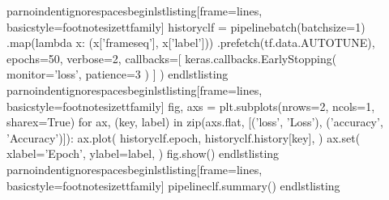 \markdownRendererDocumentBegin
\markdownRendererBackslash{}par\markdownRendererBackslash{}noindent\markdownRendererBackslash{}ignorespaces\markdownRendererBackslash{}begin\markdownRendererLeftBrace{}lstlisting\markdownRendererRightBrace{}[frame=lines, basicstyle=\markdownRendererBackslash{}footnotesize\markdownRendererBackslash{}ttfamily] historyclf = pipelinebatch(batch\markdownRendererUnderscore{}size=1) .map(lambda x: (x['frameseq'], x['label'])) .prefetch(tf.data.AUTOTUNE), epochs=50, verbose=2, callbacks=[ keras.callbacks.EarlyStopping( monitor='loss', patience=3 ) ] ) \markdownRendererBackslash{}end\markdownRendererLeftBrace{}lstlisting\markdownRendererRightBrace{} \markdownRendererBackslash{}par\markdownRendererBackslash{}noindent\markdownRendererBackslash{}ignorespaces\markdownRendererBackslash{}begin\markdownRendererLeftBrace{}lstlisting\markdownRendererRightBrace{}[frame=lines, basicstyle=\markdownRendererBackslash{}footnotesize\markdownRendererBackslash{}ttfamily]\markdownRendererInterblockSeparator
{}\markdownRendererSectionBegin
{}\markdownRendererInterblockSeparator
{}fig, axs = plt.subplots(nrows=2, ncols=1, sharex=True)\markdownRendererInterblockSeparator
{}for ax, (key, label) in zip(axs.flat, [('loss', 'Loss'), ('accuracy', 'Accuracy')]): ax.plot( historyclf.epoch, historyclf.history[key], ) ax.set( xlabel='Epoch', ylabel=label, )\markdownRendererInterblockSeparator
{}fig.show() \markdownRendererBackslash{}end\markdownRendererLeftBrace{}lstlisting\markdownRendererRightBrace{} \markdownRendererBackslash{}par\markdownRendererBackslash{}noindent\markdownRendererBackslash{}ignorespaces\markdownRendererBackslash{}begin\markdownRendererLeftBrace{}lstlisting\markdownRendererRightBrace{}[frame=lines, basicstyle=\markdownRendererBackslash{}footnotesize\markdownRendererBackslash{}ttfamily] pipeline\markdownRendererUnderscore{}clf.summary() \markdownRendererBackslash{}end\markdownRendererLeftBrace{}lstlisting\markdownRendererRightBrace{}
\markdownRendererSectionEnd \markdownRendererDocumentEnd